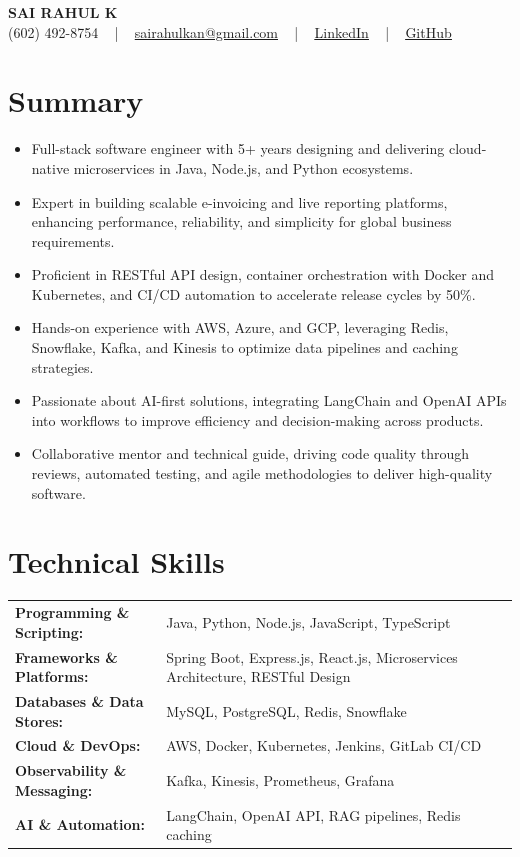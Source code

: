 \documentclass[letterpaper,11pt]{article}
\newcommand{\resumeItem}[1]{
  \item\footnotesize{
    {#1 \vspace{-2pt}}
  }
}
\newcommand{\resumeItemListStart}{\begin{itemize}[leftmargin=*]}
\newcommand{\resumeItemListEnd}{\end{itemize}\vspace{-5pt}}
\begin{document}
\begin{center}
    {\fontsize{14pt}{12pt}\selectfont \textbf{\MakeUppercase{Sai Rahul K}}}\\ \vspace{2pt}
    \fontsize{10pt}{12pt}\selectfont (602) 492-8754 ~ | ~ \href{mailto:sairahulkan@gmail.com}{sairahulkan@gmail.com} ~ | ~
    \href{https://www.linkedin.com/in/rq123/}{\color{blue}\underline{LinkedIn}} ~ | ~
    \href{https://github.com/kanrahuldo}{\color{blue}\underline{GitHub}}~
    \vspace{-8pt}
\end{center}

\section{Summary}
\fontsize{9pt}{10pt}\selectfont
\resumeItemListStart
    \resumeItem{Full-stack software engineer with 5+ years designing and delivering cloud-native microservices in Java, Node.js, and Python ecosystems.}
    \resumeItem{Expert in building scalable e-invoicing and live reporting platforms, enhancing performance, reliability, and simplicity for global business requirements.}
    \resumeItem{Proficient in RESTful API design, container orchestration with Docker and Kubernetes, and CI/CD automation to accelerate release cycles by 50\%.}
    \resumeItem{Hands-on experience with AWS, Azure, and GCP, leveraging Redis, Snowflake, Kafka, and Kinesis to optimize data pipelines and caching strategies.}
    \resumeItem{Passionate about AI-first solutions, integrating LangChain and OpenAI APIs into workflows to improve efficiency and decision-making across products.}
    \resumeItem{Collaborative mentor and technical guide, driving code quality through reviews, automated testing, and agile methodologies to deliver high-quality software.}
\resumeItemListEnd
\vspace{-6pt}

\section{Technical Skills}
        \vspace{-14pt}
        \begin{tabular}{p{0.3\linewidth} p{0.7\linewidth}}
            \textbf{Programming \& Scripting:} & Java, Python, Node.js, JavaScript, TypeScript \\
            \textbf{Frameworks \& Platforms:} & Spring Boot, Express.js, React.js, Microservices Architecture, RESTful Design \\
            \textbf{Databases \& Data Stores:} & MySQL, PostgreSQL, Redis, Snowflake \\
            \textbf{Cloud \& DevOps:} & AWS, Docker, Kubernetes, Jenkins, GitLab CI/CD \\
            \textbf{Observability \& Messaging:} & Kafka, Kinesis, Prometheus, Grafana \\
            \textbf{AI \& Automation:} & LangChain, OpenAI API, RAG pipelines, Redis caching \\
        \end{tabular}
    \vspace{-15pt}
\end{document}
